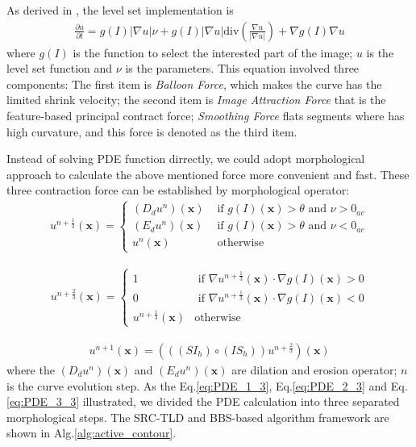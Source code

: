 As derived in \cite{Marquez-Neila2014}, the level set implementation is 
\begin{align}
\frac{\partial u}{\partial t} = g(I)|\nabla u|\nu +g(I) |\nabla u|\text{div}(\frac{\nabla u}{|\nabla u|}) + \nabla g(I) \nabla u
\end{align}
where $g(I)$ is the function to select the interested part of the image; $u$ is the level set function and $\nu$ is the parameters. This equation involved three components: The first item is \textit{Balloon Force}, which makes the curve has the limited shrink velocity; the second item is \textit{Image Attraction Force} that is the feature-based principal contract force; \textit{Smoothing Force} flats segments where has high curvature, and this force is denoted as the third item.

Instead of solving PDE function dirrectly, we could adopt morphological approach to calculate the above mentioned force more convenient and fast. These three contraction force can be established by morphological operator:
\begin{align}
\label{eq:PDE_1_3}
u^{n+\frac{1}{3}}(\mathbf{x})=\left\{ \begin{array}{ll}
(D_du^n)(\mathbf{x}) &\mbox{ if $g(I)(\mathbf{x})>\theta$ and $\nu>0_{ac}$} \\
(E_du^n)(\mathbf{x}) &\mbox{ if $g(I)(\mathbf{x})>\theta$ and $\nu<0_{ac}$} \\
u^{n}(\mathbf{x}) &\mbox{ otherwise}
\end{array} \right.
\end{align}

\begin{align}
\label{eq:PDE_2_3}
u^{n+\frac{2}{3}}(\mathbf{x})=\left\{ \begin{array}{ll}
1 &\mbox{ if $\nabla u^{n+\frac{1}{3}}(\mathbf{x}) \cdot \nabla g(I)(\mathbf{x}) > 0$} \\
0&\mbox{ if $\nabla u^{n+\frac{1}{3}}(\mathbf{x}) \cdot \nabla g(I)(\mathbf{x}) < 0$} \\
u^{n+\frac{1}{3}}(\mathbf{x}) &\mbox{otherwise}
\end{array} \right.
\end{align}

\begin{align}
\label{eq:PDE_3_3}
u^{n+1} (\mathbf{x}) = (((SI_h) \circ (IS_h)) u^{n+\frac{2}{3}})(\mathbf{x})
\end{align}
where the $(D_du^n)(\mathbf{x})$ and $(E_du^n)(\mathbf{x})$ are dilation and erosion operator; $n$ is the curve evolution step. As the Eq.\ref{eq:PDE_1_3}, Eq.\ref{eq:PDE_2_3} and Eq.\ref{eq:PDE_3_3} illustrated, we divided the PDE calculation into three separated morphological steps. The SRC-TLD and BBS-based algorithm framework are shown in Alg.\ref{alg:active_contour}.


